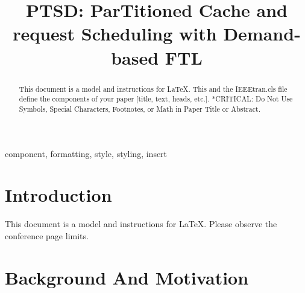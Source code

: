 \documentclass[conference]{IEEEtran}
\begin{document}
\title{PTSD: ParTitioned Cache and request Scheduling with Demand-based FTL}

\author{
\and
{}
}

\maketitle

\begin{abstract}
This document is a model and instructions for \LaTeX.
This and the IEEEtran.cls file define the components of your paper [title, text, heads, etc.]. *CRITICAL: Do Not Use Symbols, Special Characters, Footnotes, 
or Math in Paper Title or Abstract.
\end{abstract}

\begin{IEEEkeywords}
component, formatting, style, styling, insert
\end{IEEEkeywords}

\section{Introduction}
This document is a model and instructions for \LaTeX.
Please observe the conference page limits. 

\section{Background And Motivation}
\end{document}
